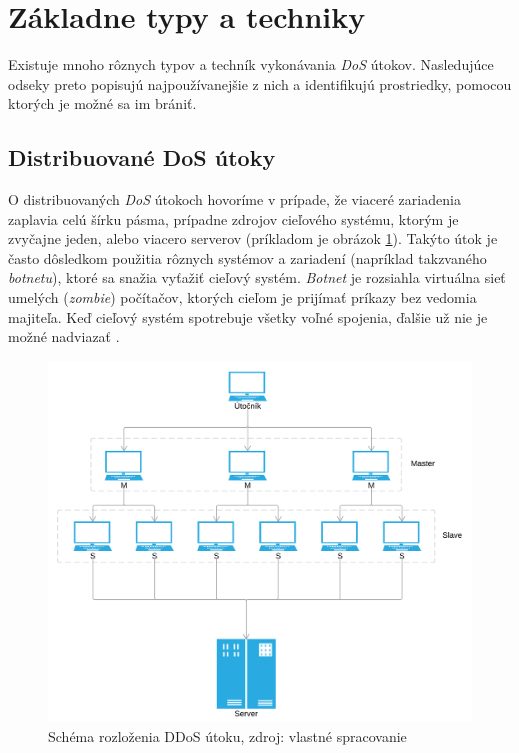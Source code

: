 \documentclass[
  printed, %
  table,   %
  lof,     %
  nolot,   %
  nocover
]{fithesis3}
\begin{document}
\section{Základne typy a techniky}
Existuje mnoho rôznych typov a techník vykonávania \textit{DoS} útokov.
Nasledujúce odseky preto popisujú najpoužívanejšie z nich a identifikujú
prostriedky, pomocou ktorých je možné sa im brániť.

\subsection{Distribuované DoS útoky}
O distribuovaných \textit{DoS} útokoch hovoríme v prípade, že viaceré zariadenia zaplavia
celú šírku pásma, prípadne zdrojov cieľového systému, ktorým je zvyčajne jeden, alebo viacero
serverov (príkladom je obrázok \ref{fig:ddos}). Takýto útok je často dôsledkom použitia rôznych systémov a zariadení (napríklad
takzvaného \textit{botnetu}), ktoré sa snažia vyťažiť cieľový systém. \textit{Botnet} je rozsiahla
virtuálna sieť umelých (\textit{zombie}) počítačov, ktorých cieľom je prijímať príkazy bez
vedomia majiteľa. Keď cieľový systém spotrebuje všetky voľné spojenia, ďalšie už nie
je možné nadviazať \cite{Zargar:2013:DDoS}. 

\begin{figure}[h]
  \centering
    \includegraphics[width=.98\textwidth]{images/ddos.png}
  \caption{Schéma rozloženia DDoS útoku, zdroj: vlastné spracovanie}
  \label{fig:ddos}
\end{figure}
\end{document}
